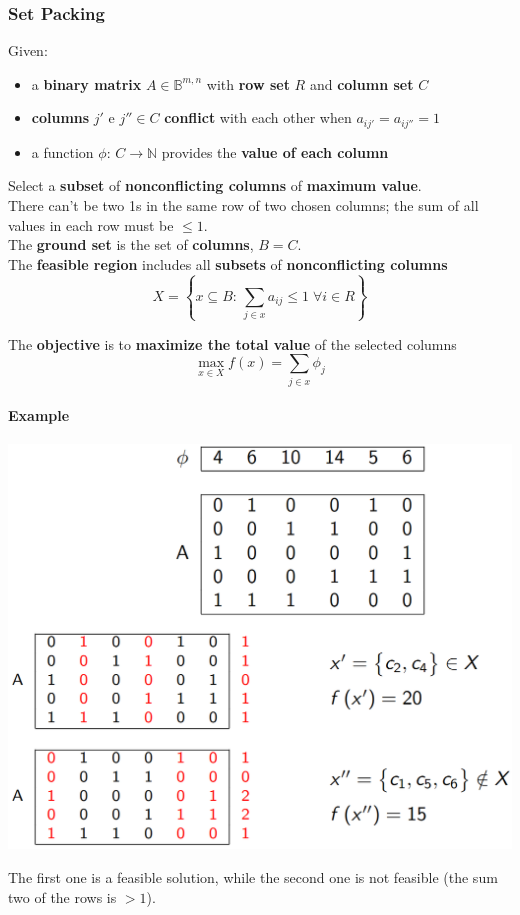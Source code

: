 \documentclass[11pt]{article}
\begin{document}
	\subsubsection{Set Packing}
	Given:
	\begin{itemize}
		\item a \textbf{binary matrix} $A \in \mathbb{B}^{m,n}$ with \textbf{row set} $R$ and \textbf{column set} $C$
		\item \textbf{columns} $j'$ e $j'' \in C$ \textbf{conflict} with each other when $a_{ij'} = a_{ij''} = 1$
		\item a function $\phi : \, C \rightarrow \mathbb{N}$ provides the \textbf{value of each column}
	\end{itemize}
	Select a \textbf{subset} of \textbf{nonconflicting columns} of \textbf{maximum value}.\\
	There can't be two 1s in the same row of two chosen columns; the sum of all values in each row must be $\leq 1$.\\
	
	The \textbf{ground set} is the set of \textbf{columns}, $B = C$.\\
	
	The \textbf{feasible region} includes all \textbf{subsets} of \textbf{nonconflicting columns}
	$$ X = \left\{x \subseteq B: \, \sum_{j \in x} a_{ij} \leq 1 \; \forall i \in R \right\}$$
	
	The \textbf{objective} is to \textbf{maximize the total value} of the selected columns
	$$ \max_{x \in X} f(x) = \sum_{j \in x} \phi_j $$
	
	\newpage
	
	\paragraph{Example}
	\begin{center}
		\includegraphics[width=\columnwidth]{img/SetPacking1}
	\end{center}
	The first one is a feasible solution, while the second one is not feasible (the sum two of the rows is $>1$).\\
	
\end{document}
